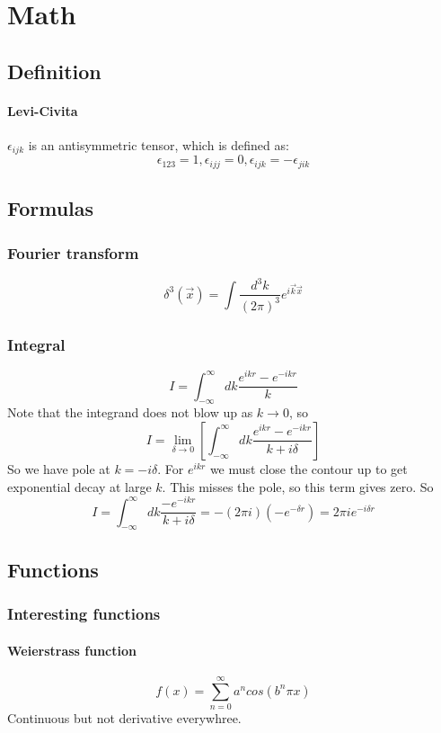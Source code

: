 \chapter{Math}

\section{Definition}
\subsubsection{Levi-Civita}
$\epsilon_{ijk}$ is an antisymmetric tensor, which is defined as: 
\[
    \epsilon_{123} = 1, \epsilon_{ijj} = 0, \epsilon_{ijk} = -\epsilon_{jik} 
    \]
\section{Formulas}

\subsection{Fourier transform}
\[
    \delta^3(\vec{x})=\int\frac{d^3k}{(2\pi)^3}e^{i\vec{k}\vec{x}}
    \]

\subsection{Integral}
\[
    I=\int_{-\infty}^{\infty}dk\frac{e^{ikr}-e^{-ikr}}{k}
    \]
Note that the integrand does not blow up as $k \rightarrow 0$, so
\[
    I=\displaystyle\lim_{\delta\rightarrow{0}}\left[\int_{-\infty}^{\infty}dk\frac{e^{ikr}-e^{-ikr}}{k+i\delta}\right]
    \]
So we have pole at $k = -i\delta$. For $e^{ikr}$ we must close the contour
up to get exponential decay at large $\mathit{k}$. This misses the pole, so
this term gives zero. So
\[
    I=\int_{-\infty}^{\infty}dk\frac{-e^{-ikr}}{k+i\delta}=-(2\pi{i})(-e^{-\delta{r}})=2\pi{i}e^{-i\delta{r}}
    \]

\section{Functions}

\subsection{Interesting functions}
\subsubsection{Weierstrass function}
\begin{equation}
    f(x) = \sum_{n=0}^{\infty}a^{n}cos(b^{n}\pi x)
\end{equation}
Continuous but not derivative everywhree.


